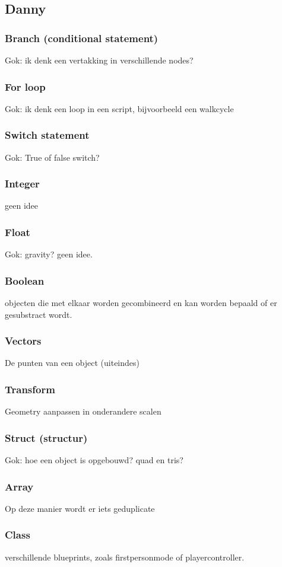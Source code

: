 \subsection*{Danny}
\subsubsection*{Branch (conditional statement)}
Gok: ik denk een vertakking in verschillende nodes?
\subsubsection*{For loop}
Gok: ik denk een loop in een script, bijvoorbeeld een walkcycle
\subsubsection*{Switch statement}
Gok: True of false switch?
\subsubsection*{Integer}
geen idee
\subsubsection*{Float}
Gok: gravity? geen idee.
\subsubsection*{Boolean}
objecten die met elkaar worden gecombineerd en kan worden bepaald of er gesubstract wordt.
\subsubsection*{Vectors}
De punten van een object (uiteindes)
\subsubsection*{Transform}
Geometry aanpassen in onderandere scalen
\subsubsection*{Struct (structur)}
Gok: hoe een object is opgebouwd? quad en tris?
\subsubsection*{Array}
Op deze manier wordt er iets geduplicate
\subsubsection*{Class}
verschillende blueprints, zoals firstpersonmode of playercontroller.
